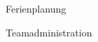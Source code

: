  \begin{figure}[H]
  	\centering
        	\caption{Ferienplanung}
\end{figure}

 \begin{figure}[H]
  	\centering
        	\caption{Teamadministration}
\end{figure}

